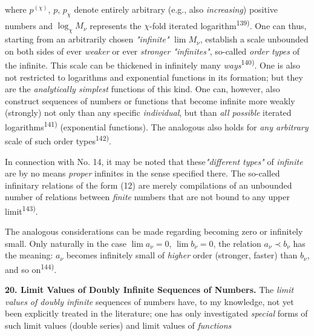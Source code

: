 \thispagestyle{fancy}

\vspace{0.5cm}

where $p^{(\chi)}$, $p$, $p_\chi$ denote entirely arbitrary (e.g., also \textit{increasing}) positive numbers and $\log_\chi M_\nu$ represents the $\chi$-fold iterated logarithm\textsuperscript{139)}. One can thus, starting from an arbitrarily chosen \textit{"infinite"} $\lim M_\nu$, establish a scale unbounded on both sides of ever \textit{weaker} or ever \textit{stronger "infinites"}, so-called \textit{order types} of the infinite. This scale can be thickened in infinitely many \textit{ways}\textsuperscript{140)}. One is also not restricted to logarithms and exponential functions in its formation; but they are the \textit{analytically simplest} functions of this kind. One can, however, also construct sequences of numbers or functions that become infinite more weakly (strongly) not only than any specific \textit{individual}, but than \textit{all possible} iterated logarithms\textsuperscript{141)} (exponential functions). The analogous also holds for \textit{any arbitrary} scale of such order types\textsuperscript{142)}.

In connection with No. 14, it may be noted that these\textit{"different types"} of \textit{infinite} are by no means \textit{proper} infinites in the sense specified there. The so-called infinitary relations of the form (12) are merely compilations of an unbounded number of relations between \textit{finite} numbers that are not bound to any upper limit\textsuperscript{143)}.

The analogous considerations can be made regarding becoming zero or infinitely small. Only naturally in the case $\lim a_\nu = 0$, $\lim b_\nu = 0$, the relation $a_\nu \prec b_\nu$ has the meaning: $a_\nu$ becomes infinitely small of \textit{higher} order (stronger, faster) than $b_\nu$, and so on\textsuperscript{144)}.

\vspace{0.2cm}
\textbf{20. Limit Values of Doubly Infinite Sequences of Numbers.} The \textit{limit values of doubly infinite} sequences of numbers have, to my knowledge, not yet been explicitly treated in the literature; one has only investigated \textit{special} forms of such limit values (double series) and limit values of \textit{functions}

